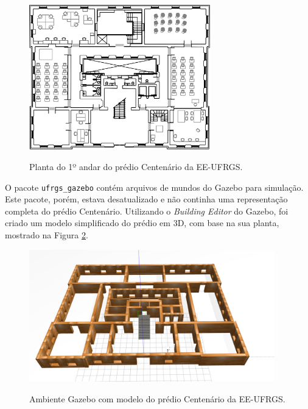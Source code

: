 \documentclass[repeatfields,xlists,xpacks,oneside,yearsonly]{ufrgscca}
\begin{document}
\begin{figure}[h]
    {
        \centering
        \caption{Planta do 1º andar do prédio Centenário da EE-UFRGS.}
        \label{fig:planta_centenario}
        \includegraphics[width=0.7\textwidth]{centenario_floor_plan.png}\\
    }
    {}
\end{figure}

O pacote \texttt{ufrgs\_gazebo} contém arquivos de mundos do Gazebo
para simulação. Este pacote, porém, estava desatualizado e não
continha uma representação completa do prédio Centenário. Utilizando
o \textit{Building Editor} do Gazebo, foi criado um modelo
simplificado do prédio em 3D, com base na sua planta, mostrado na
Figura \ref{fig:gazebo_centenario}.

\begin{figure}[h]
    {
        \centering
        \caption{Ambiente Gazebo com modelo do prédio Centenário da EE-UFRGS.}
        \label{fig:gazebo_centenario}
        \includegraphics[width=0.95\textwidth]{gazebo.png}\\
    }
\end{figure}
\end{document}
